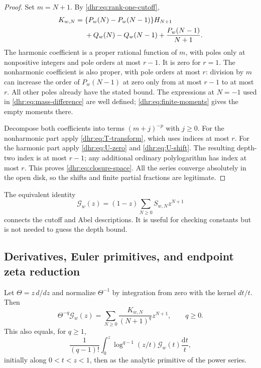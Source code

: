 \begin{proof}
Set $m=N+1$. By \eqref{dhr:eq:rank-one-cutoff},
\begin{align}
 K_{w,N}={}&\{P_w(N)-P_w(N-1)\}H_{N+1}\notag\\
          &+Q_w(N)-Q_w(N-1)+\frac{P_w(N-1)}{N+1}.
 \label{dhr:eq:mass-difference}
\end{align}
The harmonic coefficient is a proper rational function of $m$,
with poles only at nonpositive integers and pole orders at most $r-1$.
It is zero for $r=1$. The nonharmonic coefficient is also proper,
with pole orders at most $r$: division by $m$ can increase the
order of $P_w(N-1)$ at zero only from at most $r-1$ to at most $r$.
All other poles already have the stated bound. The expressions at
$N=-1$ used in \eqref{dhr:eq:mass-difference} are well defined;
\eqref{dhr:eq:finite-moments} gives the empty moments there.

Decompose both coefficients into terms $(m+j)^{-p}$ with $j\geq0$.
For the nonharmonic part apply \eqref{dhr:eq:T-transform}, which
uses indices at most $r$. For the harmonic part apply
\eqref{dhr:eq:U-zero} and \eqref{dhr:eq:U-shift}. The resulting depth-two
index is at most $r-1$; any additional ordinary polylogarithm has
index at most $r$. This proves \eqref{dhr:eq:closure-space}.
All the series converge absolutely in the open disk, so the shifts
and finite partial fractions are legitimate.
\end{proof}

The equivalent identity
\begin{equation}\label{dhr:eq:Abel-cutoff}
 \mathcal G_w(z)=(1-z)\sum_{N\geq0}S_{w,N}z^{N+1}
\end{equation}
connects the cutoff and Abel descriptions. It is useful for checking
constants but is not needed to guess the depth bound.

\subsection{Derivatives, Euler primitives, and endpoint zeta reduction}
Let $\Theta=z\,d/dz$ and normalize $\Theta^{-1}$ by integration from
zero with the kernel $dt/t$. Then
\begin{equation}\label{dhr:eq:Euler-primitive}
 \Theta^{-q}\mathcal G_w(z)=
 \sum_{N\geq0}\frac{K_{w,N}}{(N+1)^q}z^{N+1},\qquad q\geq0.
\end{equation}
This also equals, for $q\geq1$,
\begin{equation}\label{dhr:eq:Euler-integral}
 \frac1{(q-1)!}\int_0^z\log^{q-1}(z/t)
                       \mathcal G_w(t)\frac{\mathrm dt}{t},
\end{equation}
initially along $0<t<z<1$, then as the analytic primitive of the
power series.

